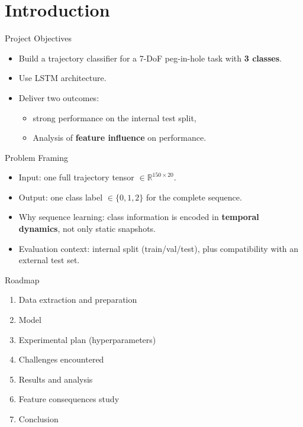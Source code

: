 

\begin{frame}
  \titlepage
\end{frame}

\section{Introduction}
\begin{frame}{Project Objectives}
\small
\begin{itemize}[<+->]
  \item Build a trajectory classifier for a 7-DoF peg-in-hole task with \textbf{3 classes}.
  \item Use LSTM architecture.
  \item Deliver two outcomes:
  \begin{itemize}[<+->]
    \item strong performance on the internal test split,
    \item Analysis of \textbf{feature influence} on performance.
  \end{itemize}
\end{itemize}
\end{frame}

\begin{frame}{Problem Framing}
\small
\begin{itemize}[<+->]
  \item Input: one full trajectory tensor \(\in \mathbb{R}^{150 \times 20}\).
  \item Output: one class label \(\in \{0,1,2\}\) for the complete sequence.
  \item Why sequence learning: class information is encoded in \textbf{temporal dynamics}, not only static snapshots.
  \item Evaluation context: internal split (train/val/test), plus compatibility with an external test set.
\end{itemize}
\end{frame}

\begin{frame}{Roadmap}
\small
\begin{enumerate}[<+->]
  \item Data extraction and preparation
  \item Model
  \item Experimental plan (hyperparameters)
  \item Challenges encountered
  \item Results and analysis
  \item Feature consequences study
  \item Conclusion
\end{enumerate}
\end{frame}

